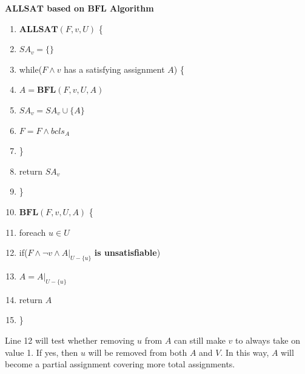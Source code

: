 \documentclass[journal]{IEEEtran}
\begin{document}
\begin{algo}
\textbf{$\boldsymbol{ALLSAT}$ based on $\boldsymbol{BFL}$ Algorithm}
\begin{enumerate}%
\item $\boldsymbol{ALLSAT}(F,v,U)$ \{
\item \hspace{0.3cm} $SA_v=\{\}$
\item \hspace{0.3cm} while($F\wedge v$ has a satisfying assignment $A$) \{
\item \hspace{0.6cm} $A= \boldsymbol{BFL}(F,v,U,A)$
\item \hspace{0.6cm} $SA_v= SA_v\cup \{A\}$
\item \hspace{0.6cm} $F= F\wedge bcls_A$
\item \hspace{0.3cm} \}
\item \hspace{0.3cm} return $SA_v$
\item \}
\item $\boldsymbol{BFL}(F,v,U,A)$ \{
\item \hspace{0.3cm} foreach $u\in U$
\item \hspace{0.6cm}  if($F\wedge \neg v\wedge A|_{U -\{u\}}$ \textbf{is unsatisfiable})
\item \hspace{0.9cm}     $A= A|_{U -\{u\}}$
\item \hspace{0.3cm} return $A$
\item \}
\end{enumerate}
\end{algo}

\vspace{0.2cm}

Line 12 will test whether removing $u$ from $A$ can still make $v$ to always take on value 1.
If yes, then $u$ will be removed from both $A$ and $V$.
In this way, $A$ will become a partial assignment covering more total assignments.
\end{document}
